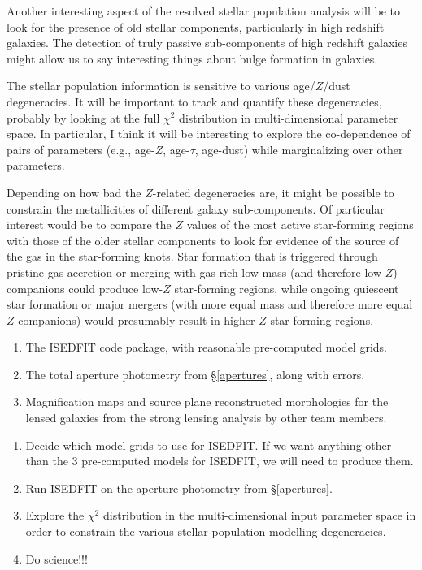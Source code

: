 \documentclass[preprint,12pt]{aastex}
\begin{document}
Another interesting aspect of the resolved stellar population analysis
will be to look for the presence of old stellar components,
particularly in high redshift galaxies.  The detection of truly
passive sub-components of high redshift galaxies might allow us to say
interesting things about bulge formation in galaxies.  

The stellar population information is sensitive to various
age/$Z$/dust degeneracies.  It will be important to track and quantify
these degeneracies, probably by looking at the full $\chi^2$
distribution in multi-dimensional parameter space.  In particular, I
think it will be interesting to explore the co-dependence of pairs of
parameters (e.g., age-$Z$, age-$\tau$, age-dust) while marginalizing
over other parameters.  

Depending on how bad the $Z$-related degeneracies are, it might be
possible to constrain the metallicities of different galaxy
sub-components.  Of particular interest would be to compare the $Z$
values of the most active star-forming regions with those of the older
stellar components to look for evidence of the source of the gas in
the star-forming knots.  Star formation that is triggered through
pristine gas accretion or merging with gas-rich low-mass (and
therefore low-$Z$) companions could produce low-$Z$ star-forming
regions, while ongoing quiescent star formation or major mergers (with
more equal mass and therefore more equal $Z$ companions) would
presumably result in higher-$Z$ star forming regions.  

\vspace{0.08in}
\vspace{-0.1in}
\begin{enumerate}\itemsep-6pt
\item {The ISEDFIT code package, with reasonable pre-computed model
  grids.}
\item {The total aperture photometry from \S\ref{apertures}, along
  with errors.}
\item {Magnification maps and source plane reconstructed morphologies
  for the lensed galaxies from the strong lensing analysis by other
  team members.}
\end{enumerate}

\vspace{-0.1in}
\begin{enumerate}\itemsep-6pt
\item {Decide which model grids to use for ISEDFIT.  If we want
  anything other than the 3 pre-computed models for ISEDFIT, we will
  need to produce them.}
\item {Run ISEDFIT on the aperture photometry from \S\ref{apertures}.}
\item {Explore the $\chi^2$ distribution in the multi-dimensional
  input parameter space in order to constrain the various stellar
  population modelling degeneracies.}
\item {Do science!!!}
\end{enumerate}
\end{document}
